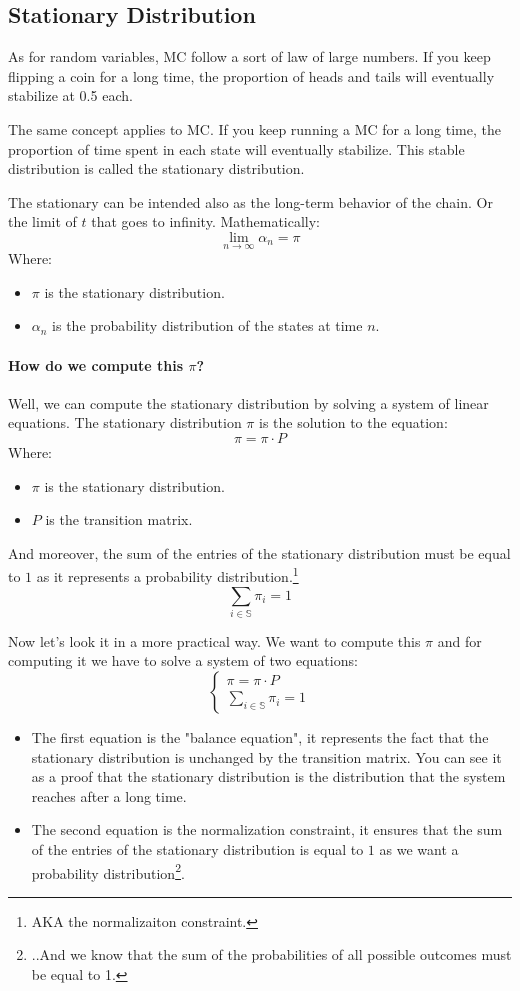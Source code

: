 \documentclass[a4paper]{article}
\begin{document}
\subsection{Stationary Distribution}
As for random variables, MC follow a sort of law of large numbers. If you keep flipping a coin for a long time, the proportion of heads and tails will eventually stabilize at 0.5 each. 

The same concept applies to MC. If you keep running a MC for a long time, the proportion of time spent in each state will eventually stabilize. This stable distribution is called the stationary distribution.

The stationary can be intended also as the long-term behavior of the chain. Or the limit of $t$ that goes to infinity. Mathematically:
$$\lim_{n \to \infty} \alpha_n = \pi$$
Where: \begin{itemize}
    \item $\pi$ is the stationary distribution.
    \item $\alpha_n$ is the probability distribution of the states at time $n$.
\end{itemize}

\paragraph{How do we compute this $\pi$?} Well, we can compute the stationary distribution by solving a system of linear equations. The stationary distribution $\pi$ is the solution to the equation:
$$\pi = \pi \cdot P$$
Where: \begin{itemize}
    \item $\pi$ is the stationary distribution.
    \item $P$ is the transition matrix.
\end{itemize}

And moreover, the sum of the entries of the stationary distribution must be equal to $1$ as it represents a probability distribution.\footnote{AKA the normalizaiton constraint.}
$$\sum_{i \in \mathbb{S}} \pi_i = 1$$

Now let's look it in a more practical way. We want to compute this $\pi$ and for computing it we have to solve a system of two equations: 
$$ \begin{cases} 
    \pi = \pi  \cdot P \\
    \sum_{i \in \mathbb{S}} \pi_i = 1
\end{cases}$$
\begin{itemize}
    \item The first equation is the "balance equation", it represents the fact that the stationary distribution is unchanged by the transition matrix. You can see it as a proof that the stationary distribution is the distribution that the system reaches after a long time. 
    \item The second equation is the normalization constraint, it ensures that the sum of the entries of the stationary distribution is equal to $1$ as we want a probability distribution\footnote{..And we know that the sum of the probabilities of all possible outcomes must be equal to 1.}. 
\end{itemize}
    
\end{document}
